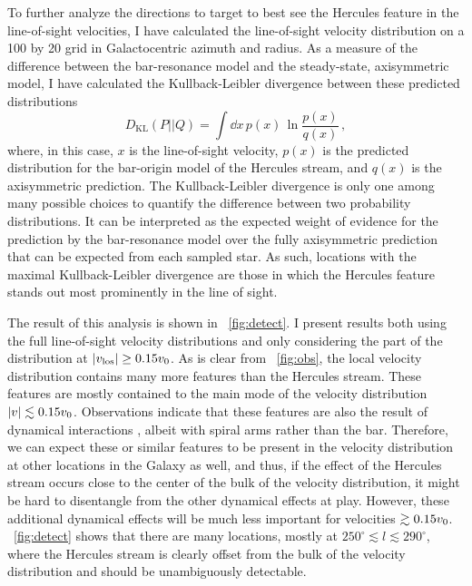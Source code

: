 To further analyze the directions to target to best see the Hercules
feature in the line-of-sight velocities, I have calculated the
line-of-sight velocity distribution on a 100 by 20 grid in
Galactocentric azimuth and radius. As a measure of the difference
between the bar-resonance model and the steady-state, axisymmetric
model, I have calculated the Kullback-Leibler divergence between these
predicted distributions \citep[\eg,][]{mackay}
\begin{equation}
D_{\text{KL}}(P||Q) = \int \dd x\,p(x)\,\ln \frac{p(x)}{q(x)}\,,
\end{equation}
where, in this case, $x$ is the line-of-sight velocity, $p(x)$ is the
predicted distribution for the bar-origin model of the Hercules
stream, and $q(x)$ is the axisymmetric prediction. The
Kullback-Leibler divergence is only one among many possible choices to
quantify the difference between two probability distributions. It can
be interpreted as the expected weight of evidence for the prediction
by the bar-resonance model over the fully axisymmetric prediction that
can be expected from each sampled star. As such, locations with the
maximal Kullback-Leibler divergence are those in which the Hercules
feature stands out most prominently in the line of sight.

The result of this analysis is shown in
\figurename~\ref{fig:detect}. I present results both using the full
line-of-sight velocity distributions and only considering the part of
the distribution at $|v_{\text{los}}| \geq 0.15 v_0$. As is clear from
\figurename~\ref{fig:obs}, the local velocity distribution contains
many more features than the Hercules stream. These features are mostly
contained to the main mode of the velocity distribution $|v| \lesssim
0.15 v_0$. Observations indicate that these features are also the
result of dynamical interactions \citep[\eg,][]{Bovy10a,sellwood10a},
albeit with spiral arms rather than the bar. Therefore, we can expect
these or similar features to be present in the velocity distribution
at other locations in the Galaxy as well, and thus, if the effect of
the Hercules stream occurs close to the center of the bulk of the
velocity distribution, it might be hard to disentangle from the other
dynamical effects at play. However, these additional dynamical effects
will be much less important for velocities $\gtrsim 0.15
v_0$. \figurename~\ref{fig:detect} shows that there are many
locations, mostly at $250^{\circ} \lesssim l \lesssim 290^{\circ}$,
where the Hercules stream is clearly offset from the bulk of the
velocity distribution and should be unambiguously detectable.

